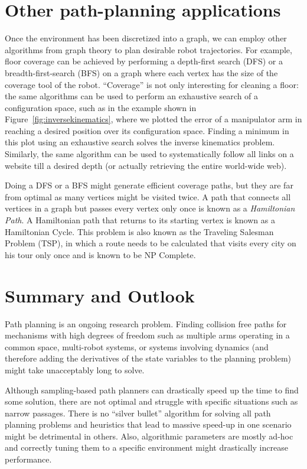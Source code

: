 \section{Other path-planning applications}
Once the environment has been discretized into a graph, we can employ other algorithms from graph theory to plan desirable robot trajectories. For example, floor coverage can be achieved by performing a depth-first search (DFS) or a breadth-first-search (BFS) on a graph where each vertex has the size of the coverage tool of the robot. ``Coverage'' is not only interesting for cleaning a floor: the same algorithms can be used to perform an exhaustive search of a configuration space, such as in the example shown in Figure~\ref{fig:inversekinematics}, where we plotted the error of a manipulator arm in reaching a desired position over its configuration space. Finding a minimum in this plot using an exhaustive search solves the inverse kinematics problem. Similarly, the same algorithm can be used to systematically follow all links on a website till a desired depth (or actually retrieving the entire world-wide web).

Doing a DFS or a BFS might generate efficient coverage paths, but they are far from optimal as many vertices might be visited twice. A path that connects all vertices in a graph but passes every vertex only once is known as a \emph{Hamiltonian Path}. A Hamiltonian path that returns to its starting vertex is known as a Hamiltonian Cycle. This problem is also known as the Traveling Salesman Problem (TSP), in which a route needs to be calculated that visits every city on his tour only once and is known to be NP Complete.



\section{Summary and Outlook}
Path planning is an ongoing research problem. Finding collision free paths for mechanisms with high degrees of freedom such as multiple arms operating in a common space, multi-robot systems, or systems involving dynamics (and therefore adding the derivatives of the state variables to the planning problem) might take unacceptably long to solve.

Although sampling-based path planners can drastically speed up the time to find some solution, there are not optimal and struggle with specific situations such as narrow passages. There is no ``silver bullet'' algorithm for solving all path planning problems and heuristics that lead to massive speed-up in one scenario might be detrimental in others. Also, algorithmic parameters are mostly ad-hoc and correctly tuning them to a specific environment might drastically increase performance.


